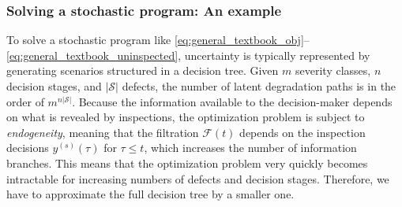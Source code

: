 \documentclass{article}
\begin{document}
\subsubsection{Solving a stochastic program: An example}
To solve a stochastic program like \cref{eq:general_textbook_obj}--\cref{eq:general_textbook_uninspected}, uncertainty is typically represented by generating scenarios structured in a decision tree.
Given $m$ severity classes, $n$ decision stages, and $|\mathcal S|$ defects, the number of latent degradation paths is in the order of $m^{n|\mathcal S|}$.
Because the information available to the decision-maker depends on what is revealed by inspections, the optimization problem is subject to \textit{endogeneity}, 
meaning that the filtration $\mathcal F(t)$ depends on the inspection decisions $y^{(s)}(\tau)$ for $\tau\le t$, which increases the number of information branches.
This means that the optimization problem very quickly becomes intractable for increasing numbers of defects and decision stages.
Therefore, we have to approximate the full decision tree by a smaller one.
\end{document}
